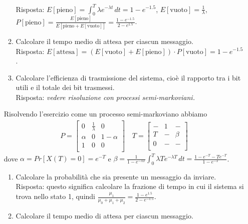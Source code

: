 \documentclass{article}
\begin{document}
\begin{enumerate}
\begin{enumerate}[label=\alph*)]
        Risposta: $E[\text{pieno}] = \int_0^T \lambda e^{-\lambda t}\, dt = 1 - e^{-1.5}$, $E[\text{vuoto}] = \frac{1}{\lambda}$, $P[\text{pieno}] = \frac{E[\text{pieno}]}{E[\text{pieno} + E[\text{vuoto}]]} = \frac{1-e^{-1.5}}{2-e^{1.5}}$.
        \item Calcolare il tempo medio di attesa per ciascun messaggio.\\
        
        Risposta: $E[\text{attesa}] = (E[\text{vuoto}] + E[\text{pieno}])\cdot P[\text{vuoto}] = 1 - e^{-1.5}$.
        \item Calcolare l'efficienza di trasmissione del sistema, cioè il rapporto tra i bit utili e il totale dei bit trasmessi.\\
        
        Risposta: \emph{vedere risoluzione con processi semi-markoviani.}
    \end{enumerate}
    
    Risolvendo l'esercizio come un processo semi-markoviano abbiamo
    \begin{align*}
    P = \left[\begin{array}{ccc}
    0 & \frac{1}{\lambda} & 0\\
  	\alpha & 0 & 1-\alpha\\
    1 & 0 & 0\\
    \end{array}\right]
    	\quad
    	T = \left[\begin{array}{ccc}
    - & 1 & -\\
  	T & - & \beta\\
    0 & - & -\\
    \end{array}\right]
    \end{align*}
    dove $\alpha = Pr[X(T) = 0] = e^{-T}$ e $\beta = \frac{1}{1-e^{-\lambda T}} \int_0^T \lambda T e^{-\lambda T}\,dt = \frac{1-e^{-T} -T e^{-T}}{1-e^{-T}}$.
    \begin{enumerate}[label=\alph*)]
        \item Calcolare la probabilità che sia presente un messaggio da inviare.\\
        
        Risposta: questo significa calcolare la frazione di tempo in cui il sistema si trova nello stato 1, quindi $\frac{\mu_1}{\mu_0+\mu_1+\mu_2} = \frac{1-e^{1.5}}{2-e^{-1.5}}$.
        \item Calcolare il tempo medio di attesa per ciascun messaggio.\\
        

\end{enumerate}
\end{enumerate}
\end{document}
